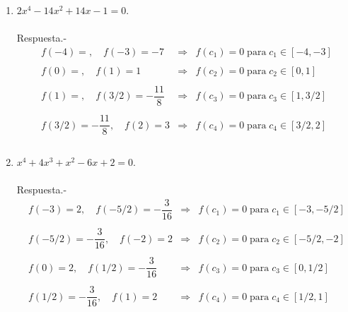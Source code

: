 \begin{enumerate}[\bfseries 1.]
\begin{enumerate}[\bfseries (a)]
	    \item $2x^4-14x^2+14x-1=0$.\\\\
		Respuesta.-\; 
		$$\begin{array}{lcl}
		    f(-4)=,\quad f(-3)=-7&\Longrightarrow & f(c_1)=0\; \mbox{para}\; c_1 \in [-4,-3]\\\\
		    f(0)=,\quad f(1)=1&\Longrightarrow & f(c_2)=0\; \mbox{para}\; c_2 \in [0,1]\\\\
		    f(1)=,\quad f(3/2)=-\dfrac{11}{8}&\Longrightarrow & f(c_3)=0\; \mbox{para}\; c_3 \in [1,3/2]\\\\
		    f(3/2)=-\dfrac{11}{8},\quad f(2)=3&\Longrightarrow & f(c_4)=0\; \mbox{para}\; c_4 \in [3/2,2]\\\\
		\end{array}$$

	    \item $x^4+4x^3+x^2-6x+2=0$.\\\\
		Respuesta.-\; 
		$$\begin{array}{lcl}
		    f(-3)=2,\quad f(-5/2)=-\dfrac{3}{16}&\Longrightarrow & f(c_1)=0\; \mbox{para}\; c_1 \in [-3,-5/2]\\\\
		    f(-5/2)=-\dfrac{3}{16},\quad f(-2)=2&\Longrightarrow & f(c_2)=0\; \mbox{para}\; c_2 \in [-5/2,-2]\\\\
		    f(0)=2,\quad f(1/2)=-\dfrac{3}{16}&\Longrightarrow & f(c_3)=0\; \mbox{para}\; c_3 \in [0,1/2]\\\\
		    f(1/2)=-\dfrac{3}{16},\quad f(1)=2&\Longrightarrow & f(c_4)=0\; \mbox{para}\; c_4 \in [1/2,1]\\\\
		\end{array}$$
	\end{enumerate}

	\vspace{.5cm}


\end{enumerate}
